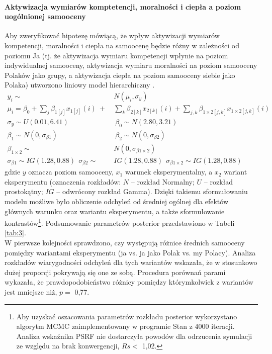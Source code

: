 \documentclass[man]{apa6}
\begin{document}
\paragraph{Aktywizacja wymiarów komptetencji, moralności i ciepła a poziom uogólnionej samooceny}
Aby zweryfikować hipotezę mówiącą, że wpływ aktywizacji wymiarów kompetencji, moralności i ciepła na samoocenę będzie różny w zależności od poziomu Ja (tj. że aktywizacja wymiaru kompetencji wpłynie na poziom indywidualnej samooceny, aktywizacja wymiaru moralności na poziom samooceny Polaków jako grupy, a aktywizacja ciepła na poziom samooceny siebie jako Polaka) utworzono liniowy model hierarchiczny \parencite[jako odpowiednik klasycznej dwuczynnikowej analizy wariancji, za:,][]{kruschke2014doing}.
\begin{equation}\label{eq:4}
\begin{split}
y_i  \sim\ & N(\mu_i, \sigma_y) \\
\mu_i  = \beta_0 + \sum_j\beta_{1[j]}x_{1[j]}(i)\ +\ &\sum_k\beta_{2[k]}x_{2[k]}(i)+\sum_{j,k}\beta_{1\times2[j,k]}x_{1\times2[j,k]}(i) \\
\sigma_y \sim U(0.01,6.41)\ &\ \beta_0 \sim N(2.80, 3.21) \\
\beta_1 \sim N(0, \sigma_{\beta1})\ &\ \beta_2 \sim N(0, \sigma_{\beta2}) \\
\beta_{1\times2} \sim\ & N(0, \sigma_{\beta1\times2}) \\
\sigma_{\beta1} \sim IG(1.28,0.88)\ \ \sigma_{\beta2} \sim\ & IG(1.28,0.88)\ \ \sigma_{\beta1\times2} \sim IG(1.28,0.88)
\end{split}
\end{equation}
gdzie $y$ oznacza poziom samooceny, $x_1$ warunek eksperymentalny, a $x_2$ wariant eksperymentu (oznaczenia rozkładów: $N$ -- rozkład Normalny; $U$ -- rozkład prostokątny; $IG$ -- odwrócony rozkład Gamma). Dzięki takiemu sformułowaniu modelu możliwe było obliczenie odchyleń od średniej ogólnej dla efektów głównych warunku oraz wariantu eksperymentu, a także sformułowanie kontrastów\footnote{Aby uzyskać oszacowania parametrów rozkładu posterior wykorzystano algorytm MCMC zaimplementowany w programie Stan \parencite{carpenter2016} z 4000 iteracji. Analiza wskaźnika PSRF nie dostarczyła powodów dla odrzucenia symulacji ze względu na brak konwergencji, $Rs <$ 1,02.}. Podsumowanie parametrów posterior przedstawiono w Tabeli \ref{tab:3}. \\

W pierwsze kolejności sprawdzono, czy występują różnice średnich samooceny pomiędzy wariantami eksperymentu (ja vs. ja jako Polak vs. my Polacy). Analiza rozkładów wiarygodności odchyleń dla tych wariantów wskazała, że w stosunkowo dużej proporcji pokrywają się one ze sobą. Procedura porównań parami wykazała, że prawdopodobieństwo różnicy pomiędzy którymkolwiek z wariantów jest mniejsze niż, $p =$ 0,77. \\
\end{document}
